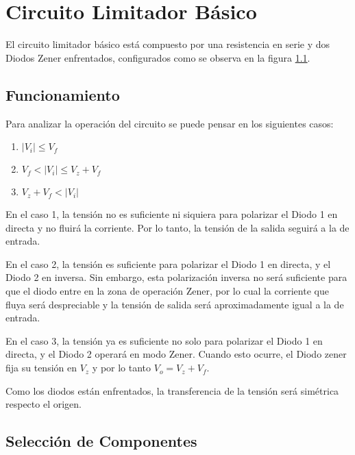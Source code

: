 \chapter{Circuito Limitador Básico}
El circuito limitador básico está compuesto por una resistencia en serie y dos Diodos Zener enfrentados, configurados como se observa en la figura \ref{fig:limitador_basico}.

\begin{figure}[ht]
    \begin{center}
        
        \label{fig:limitador_basico}
    \end{center}
\end{figure}

\section{Funcionamiento}
Para analizar la operación del circuito se puede pensar en los siguientes casos:

\begin{enumerate}
    \item $|V_i| \leq V_f$
    \item $V_f < |V_i| \leq V_z + V_f$
    \item $V_z + V_f < |V_i|$ 
\end{enumerate}

En el caso 1, la tensión no es suficiente ni siquiera para polarizar el Diodo 1 en directa y no fluirá la corriente. Por lo tanto, la tensión de la salida seguirá a la de entrada.

En el caso 2, la tensión es suficiente para polarizar el Diodo 1 en directa, y el Diodo 2 en inversa. Sin embargo, esta polarización inversa no será suficiente para que el diodo entre en la zona de operación Zener, por lo cual la corriente que fluya será despreciable y la tensión de salida será aproximadamente igual a la de entrada.

En el caso 3, la tensión ya es suficiente no solo para polarizar el Diodo 1 en directa, y el Diodo 2 operará en modo Zener. Cuando esto ocurre, el Diodo zener fija su tensión en $V_z$ y por lo tanto $V_o = V_z + V_f$.

Como los diodos están enfrentados, la transferencia de la tensión será simétrica respecto el origen.

\section{Selección de Componentes}

